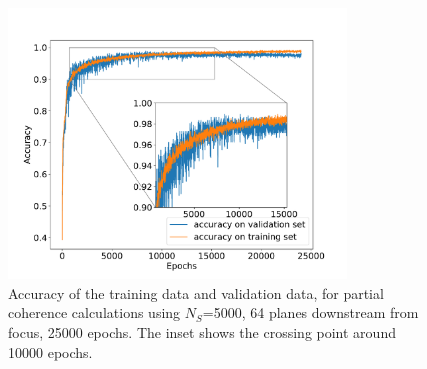 \documentclass{iucr}
\newcommand{\inred}[1]{{\color{black}#1}}
\begin{document}
\begin{figure}\label{fig:multimode_accuracy}
    \includegraphics[width=0.8\textwidth]{figures/figure5.pdf}
    \caption{Accuracy of the training data and validation data, for partial coherence calculations \inred{using} $N_S$=5000, 64 planes downstream from focus, 25000 epochs. \inred{The inset shows} the crossing point around 10000 epochs.
    }
\end{figure}
\end{document}

